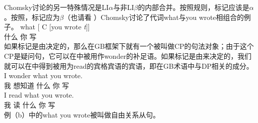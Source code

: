 Chomsky讨论的另一特殊情况是LI$\alpha$与非LI$\beta$的内部合并。按照规则，标记应该是$\alpha$。按照，标记应为$\beta$（也请看 ）Chomsky讨论了代词what与you wrote相组合的例子。
\ea
\label{ex-what-you-wrote}
\gll what [ C [you wrote \emph{t}]]\\
什么 \spacebr{} {} \spacebr{}你 写 \\
\z
如果标记是由决定的，那么在GB框架下就有一个被叫做CP的句法对象；由于这个CP是疑问句，它可以在中被用作wonder的补足语。如果标记是由来决定的，我们就可以在中得到被用为read的宾格宾语的宾语，即在GB术语中与DP相关的成分。
\eal
\ex 
\gll I wonder what you wrote.\\
我 想知道 什么 你 写\\
\ex\label{ex-i-read-what-you-wrote} 
\gll I read what you wrote.\\
我 读 什么 你 写\\
\zl
例（b）中的what you wrote被叫做自由关系从句。


